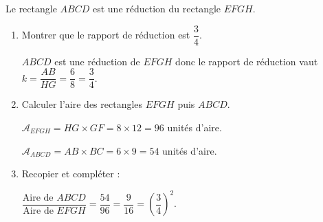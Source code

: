 \begin{corrige}
    Le rectangle $ABCD$ est une réduction du rectangle $EFGH$.


    \begin{enumerate}
        \item Montrer que le rapport de réduction est $\dfrac{3}{4}$.
        
        {\color{red} $ABCD$ est une réduction de $EFGH$ donc le rapport de réduction vaut $k=\dfrac{AB}{HG}=\dfrac{6}{8}=\dfrac{3}{4}$.}
        \item Calculer l'aire des rectangles $EFGH$ puis $ABCD$.
        
        {\color{red}$\mathcal{A}_{EFGH}=HG\times GF=8\times 12 = 96$ unités d'aire.
        
        $\mathcal{A}_{ABCD}=AB\times BC=6\times 9 = 54$ unités d'aire.
        }
        \item Recopier et compléter : 
        
        {\color{red}$\dfrac{\text{Aire de $ABCD$}}{\text{Aire de $EFGH$}}=\dfrac{54}{96}=\dfrac{9}{16}=\left(\dfrac{3}{4}\right)^2$.}
    \end{enumerate}
\end{corrige}